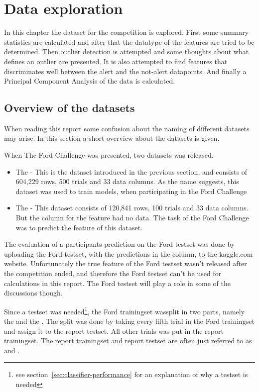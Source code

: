 \chapter{Data exploration}
In this chapter the dataset for the competition is explored. First some summary statistics are calculated and after that the datatype of the features are tried to be determined. Then outlier detection is attempted and some thoughts about what defines an outlier are presented. It is also attempted to find features that discriminates well between the alert and the not-alert datapoints. And finally a Principal Component Analysis of the data is calculated. 


\section{Overview of the datasets}
When reading this report some confusion about the naming of different datasets may arise. In this section a short overview about the datasets is given. \par
When The Ford Challenge was presented, two datasets was released.
\begin{itemize}
    \item The  - This is the dataset introduced in the previous section, and consists of 604,229 rows, 500 trials and 33 data columns. As the name suggests, this dataset was used to train models, when participating in the Ford Challenge
    \item The  - This dataset consists of 120,841 rows, 100 trials and 33 data columns. But the column for the  feature had no data. The task of the Ford Challenge was to predict the  feature of this dataset. 
\end{itemize}
The evaluation of a participants prediction on the Ford testset was done by uploading the Ford testset, with the predictions in the  column, to the kaggle.com website. Unfortunately the true  feature of the Ford testset wasn't released after the competition ended, and therefore the Ford testset can't be used for calculations in this report. The Ford testset will play a role in some of the discussions though. \par
Since a testset was needed\footnote{see section~\ref{sec:classifier-performance} for an explanation of why a testset is needed}, the Ford trainingset wassplit in two parts, namely the  and the . The split was done by taking every fifth trial in the Ford trainingset and assign it to the report testset. All other trials was put in the report trainingset. The report trainingset and report testset are often just referred to as  and .


